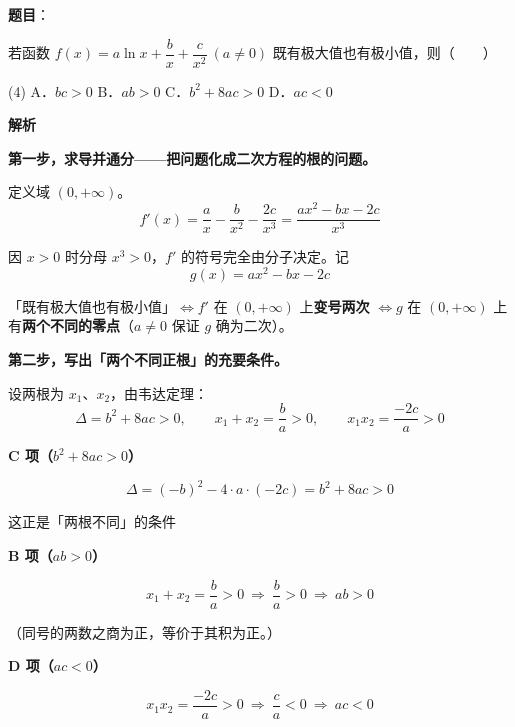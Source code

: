 \begin{answer}

\textbf{题目}：

若函数 $f(x)=a\ln x+\dfrac bx+\dfrac c{x^{2}}\ (a\ne0)$ 既有极大值也有极小值，则\mbox{（　　）}

\begin{gkopts}(4)
\task A．$bc>0$
\task B．$ab>0$
\task C．$b^{2}+8ac>0$
\task D．$ac<0$
\end{gkopts}

\textbf{解析}

\textbf{第一步，求导并通分——把问题化成二次方程的根的问题。}

定义域 $(0,+\infty)$。
\nopagebreak[4]
\[f'(x)=\frac ax-\frac b{x^{2}}-\frac{2c}{x^{3}}=\frac{ax^{2}-bx-2c}{x^{3}}\]

因 $x>0$ 时分母 $x^{3}>0$，$f'$ 的符号完全由分子决定。记
\nopagebreak[4]
\[g(x)=ax^{2}-bx-2c\]

「既有极大值也有极小值」$\iff f'$ 在 $(0,+\infty)$ 上\textbf{变号两次} $\iff g$ 在 $(0,+\infty)$ 上有\textbf{两个不同的零点}（$a\ne0$ 保证 $g$ 确为二次）。

\textbf{第二步，写出「两个不同正根」的充要条件。}

设两根为 $x_1$、$x_2$，由韦达定理：
\nopagebreak[4]
\[\Delta=b^{2}+8ac>0,\qquad x_1+x_2=\frac ba>0,\qquad x_1x_2=\frac{-2c}a>0\]

\par\medskip

\textbf{C 项（$b^{2}+8ac>0$）}

\nopagebreak[4]
\[\Delta=(-b)^{2}-4\cdot a\cdot(-2c)=b^{2}+8ac>0\]

这正是「两根不同」的条件 

\par\medskip

\textbf{B 项（$ab>0$）}

\nopagebreak[4]
\[x_1+x_2=\frac ba>0\ \Longrightarrow\ \frac ba>0\ \Longrightarrow\ ab>0\]

（同号的两数之商为正，等价于其积为正。）

\par\medskip

\textbf{D 项（$ac<0$）}

\nopagebreak[4]
\[x_1x_2=\frac{-2c}a>0\ \Longrightarrow\ \frac ca<0\ \Longrightarrow\ ac<0\]


\end{answer}
